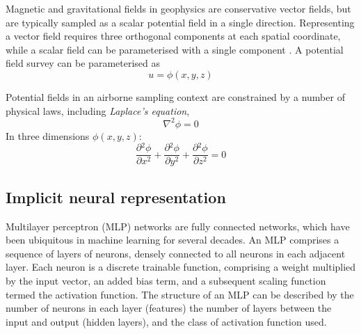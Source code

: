 \documentclass[manuscript.tex]{subfiles}
\begin{document}
\label{sec:geo_physics}
Magnetic and gravitational fields in geophysics are conservative vector fields, but are typically sampled as a scalar potential field in a single direction.
Representing a vector field requires three orthogonal components at each spatial coordinate, while a scalar field can be parameterised with a single component \parencite{blakelyPotentialTheoryGravity1996}.
A potential field survey can be parameterised as
\begin{equation}
    u = \phi\left(x,y,z\right)
\end{equation}


Potential fields in an airborne sampling context are constrained by a number of physical laws, including \emph{Laplace's equation},
\[
    \nabla^2 \phi = 0
\]
In three dimensions \( \phi\left(x,y,z\right) \):
\begin{equation}
    \label{eqn:Laplace}
    \frac{\partial{}^2\phi}{\partial{}x^2} + \frac{\partial{}^2\phi}{\partial{}y^2} + \frac{\partial{}^2\phi}{\partial{}z^2} = 0
\end{equation}



\subsection{Implicit neural representation}
\label{sec:inr}
Multilayer perceptron (MLP) networks are fully connected networks, which have been ubiquitous in machine learning for several decades.
An MLP comprises a sequence of layers of neurons, densely connected to all neurons in each adjacent layer.
Each neuron is a discrete trainable function, comprising a weight multiplied by the input vector, an added bias term, and a subsequent scaling function termed the activation function.
The structure of an MLP can be described by the number of neurons in each layer (features) the number of layers between the input and output (hidden layers), and the class of activation function used.
\end{document}
